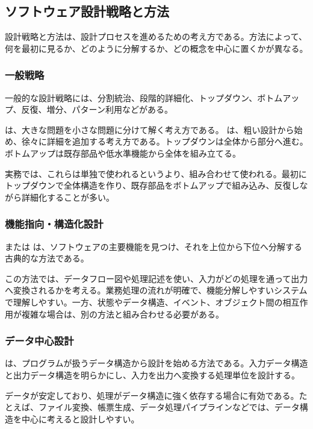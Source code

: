 \subsection{ソフトウェア設計戦略と方法}

設計戦略と方法は、設計プロセスを進めるための考え方である。方法によって、何を最初に見るか、どのように分解するか、どの概念を中心に置くかが異なる。

\subsubsection{一般戦略}

一般的な設計戦略には、分割統治、段階的詳細化、トップダウン、ボトムアップ、反復、増分、パターン利用などがある。

 は、大きな問題を小さな問題に分けて解く考え方である。 は、粗い設計から始め、徐々に詳細を追加する考え方である。トップダウンは全体から部分へ進む。ボトムアップは既存部品や低水準機能から全体を組み立てる。

実務では、これらは単独で使われるというより、組み合わせて使われる。最初にトップダウンで全体構造を作り、既存部品をボトムアップで組み込み、反復しながら詳細化することが多い。

\subsubsection{機能指向・構造化設計}

 または は、ソフトウェアの主要機能を見つけ、それを上位から下位へ分解する古典的な方法である。

この方法では、データフロー図や処理記述を使い、入力がどの処理を通って出力へ変換されるかを考える。業務処理の流れが明確で、機能分解しやすいシステムで理解しやすい。一方、状態やデータ構造、イベント、オブジェクト間の相互作用が複雑な場合は、別の方法と組み合わせる必要がある。

\subsubsection{データ中心設計}

 は、プログラムが扱うデータ構造から設計を始める方法である。入力データ構造と出力データ構造を明らかにし、入力を出力へ変換する処理単位を設計する。

データが安定しており、処理がデータ構造に強く依存する場合に有効である。たとえば、ファイル変換、帳票生成、データ処理パイプラインなどでは、データ構造を中心に考えると設計しやすい。

